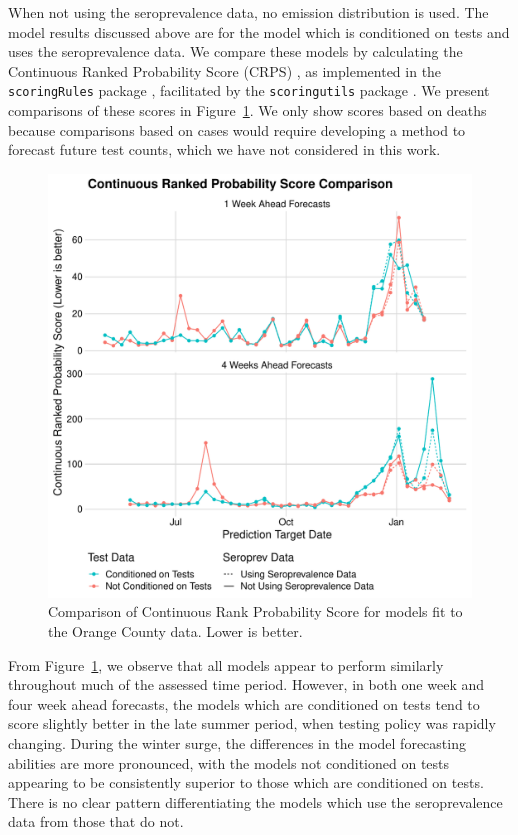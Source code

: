 When not using the seroprevalence data, no emission distribution is used.
The model results discussed above are for the model which is conditioned on tests and uses the seroprevalence data.
We compare these models by calculating the Continuous Ranked Probability Score (CRPS) \citep{CRPS}, as implemented in the \texttt{scoringRules} package \citep{scoringRules}, facilitated by the \texttt{scoringutils} package \citep{scoringutils}.
We present comparisons of these scores in Figure~\ref{ch_4:fig:forecast_crps_plot}.
We only show scores based on deaths because comparisons based on cases would require developing a method to forecast future test counts, which we have not considered in this work.

\begin{figure}[htbp]
    \centering
    \includegraphics[width=0.75\columnwidth]{forecast_crps_plot}
    \caption{Comparison of Continuous Rank Probability Score for models fit to the Orange County data.
    Lower is better.}
    \label{ch_4:fig:forecast_crps_plot}
\end{figure}

From Figure~\ref{ch_4:fig:forecast_crps_plot}, we observe that all models appear to perform similarly throughout much of the assessed time period.
However, in both one week and four week ahead forecasts, the models which are conditioned on tests tend to score slightly better in the late summer period, when testing policy was rapidly changing.
During the winter surge, the differences in the model forecasting abilities are more pronounced, with the models not conditioned on tests appearing to be consistently superior to those which are conditioned on tests.
There is no clear pattern differentiating the models which use the seroprevalence data from those that do not.

